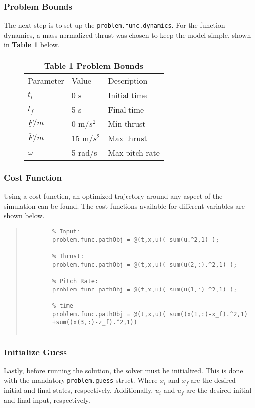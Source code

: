 \documentclass[12pt]{article}
\begin{document}
	\subsubsection{Problem Bounds}
	The next step is to set up the \lstinline!problem.func.dynamics!. For the function dynamics, a mass-normalized thrust was chosen to keep the model simple, shown in \textbf{Table 1} below. 
	\begin{figure}[H]
		\begin{center}
			\begin{tabular}{ |p{2.5cm}||p{2cm}||p{3cm}| }
				\hline
				\multicolumn{3}{|c|}{\textbf{Table 1}   Problem Bounds} \\
				\hline
				Parameter & Value & Description\\
				\hline
				$t_{i}$   & 0 s  & Initial time\\
				$t_{f}$  & 5 s  & Final time\\
				$\underline{F}/m$ & 0 m/$s^{2}$ & Min thrust\\
				$\overline{F}/m$ & 15 m/$s^{2}$ & Max thrust\\
				$\overline{\omega}$ & 5 rad/s & Max pitch rate \\
				\hline
			\end{tabular}
		\end{center}
	\end{figure}
	
	\clearpage
	
	\subsubsection{Cost Function}
	Using a cost function, an optimized trajectory around any aspect of the simulation can be found. The cost functions available for different variables are shown below. 
	\begin{quote}
		\begin{lstlisting}
		% Input:
		problem.func.pathObj = @(t,x,u)( sum(u.^2,1) );
		
		% Thrust:
		problem.func.pathObj = @(t,x,u)( sum(u(2,:).^2,1) );
		
		% Pitch Rate:
		problem.func.pathObj = @(t,x,u)( sum(u(1,:).^2,1) );
		
		% time
		problem.func.pathObj = @(t,x,u)( sum((x(1,:)-x_f).^2,1) 
		+sum((x(3,:)-z_f).^2,1))
		
		\end{lstlisting}
	\end{quote}
	
	\subsubsection{Initialize Guess}
	Lastly, before running the solution, the solver must be initialized. This is done with the mandatory \lstinline!problem.guess! struct. Where $x_{i}$ and $x_{f}$ are the desired initial and final states, respectively. Additionally, $u_{i}$ and $u_{f}$ are the desired initial and final input, respectively. 
	
\end{document}
